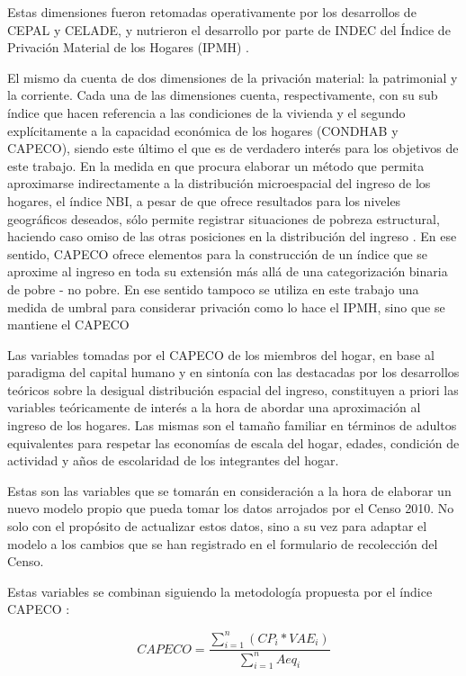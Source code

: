 Estas dimensiones fueron retomadas operativamente por los desarrollos de CEPAL y CELADE, y nutrieron el desarrollo por parte de INDEC del Índice de Privación Material de los Hogares (IPMH) \cite{indec2000b,indec2003a,indec2003b,indec2003c,indec2003d,alvarez2002}.

El mismo da cuenta de dos dimensiones de la privación material: la patrimonial y la corriente. Cada una de las dimensiones cuenta, respectivamente, con su sub índice que hacen referencia a las condiciones de la vivienda y el segundo explícitamente a la capacidad económica de los hogares (CONDHAB y CAPECO), siendo este último el que es de verdadero interés para los objetivos de este trabajo. En la medida en que procura elaborar un método que permita aproximarse indirectamente a la distribución microespacial del ingreso de los hogares, el índice NBI, a pesar de que ofrece resultados para los niveles geográficos deseados, sólo permite registrar situaciones de pobreza estructural, haciendo caso omiso de las otras posiciones en la distribución del ingreso \cite{indec1984,indec1996}. En ese sentido, CAPECO ofrece elementos para la construcción de un índice que se aproxime al ingreso en toda su extensión más allá de una categorización binaria de pobre - no pobre. En ese sentido tampoco se utiliza en este trabajo una medida de umbral para considerar privación como lo hace el IPMH, sino que se mantiene el CAPECO

Las variables tomadas por el CAPECO de los miembros del hogar, en base al paradigma del capital humano y en sintonía con las destacadas por los desarrollos teóricos sobre la desigual distribución espacial del ingreso, constituyen a priori las variables teóricamente de interés a la hora de abordar una aproximación al ingreso de los hogares. Las mismas son el tamaño familiar en términos de adultos equivalentes para respetar las economías de escala del hogar, edades, condición de actividad y años de escolaridad de los integrantes del hogar.

Estas son las variables que se tomarán en consideración a la hora de elaborar un nuevo modelo propio que pueda tomar los datos arrojados por el Censo 2010. No solo con el propósito de actualizar estos datos, sino a su vez para adaptar el modelo a los cambios que se han registrado en el formulario de recolección del Censo.

Estas variables se combinan siguiendo la metodología propuesta por el índice CAPECO \cite{indec2003c}:

$$ CAPECO = \frac{\displaystyle\sum_{i=1}^{n}(CP_i * VAE_i)}{\displaystyle\sum_{i=1}^{n}Aeq_i} $$


